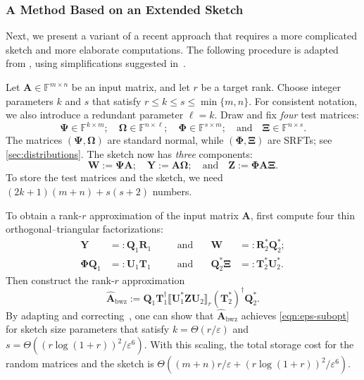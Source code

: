 \documentclass[final]{siamart1116}
\numberwithin{equation}{section}
\numberwithin{theorem}{section}
\numberwithin{figure}{section}
\newcommand{\F}{\mathbb{F}}
\newcommand{\eps}{\varepsilon}
\newcommand{\mtx}[1]{\bm{#1}}
\newcommand{\lowrank}[2]{\llbracket {#1} \rrbracket_{#2}}
\begin{document}
\subsubsection{A Method Based on an Extended Sketch}
\label{sec:optimal-alg}


Next, we present a variant of a recent approach that requires
a more complicated sketch and more elaborate computations.
The following procedure is adapted from \cite[Thm.~12]{BWZ16:Optimal-Principal-STOC},
using simplifications suggested in~\cite[Sec.~3]{Upa16:Fast-Space-Optimal}.

Let $\mtx{A} \in \F^{m \times n}$ be an input matrix,
and let $r$ be a target rank.  Choose integer parameters $k$ and $s$
that satisfy $r \leq k \leq s \leq \min\{m,n\}$.
For consistent notation, we also introduce a redundant parameter $\ell = k$.
Draw and fix \emph{four} test matrices:
\begin{equation} \label{eqn:fancy-test}
\mtx{\Psi} \in \F^{k \times m}; \quad
\mtx{\Omega} \in \F^{n \times \ell}; \quad
\mtx{\Phi} \in \F^{s \times m}; \quad\text{and}\quad
\mtx{\Xi} \in \F^{n \times s}.
\end{equation}
The matrices $(\mtx{\Psi}, \mtx{\Omega})$ are standard normal,
while $(\mtx{\Phi}, \mtx{\Xi})$ are SRFTs; see \cref{sec:distributions}.
The sketch now has \emph{three} components:
\begin{equation} \label{eqn:fancy-sketch}
\mtx{W} := \mtx{\Psi A}; \quad
\mtx{Y} := \mtx{A\Omega}; \quad\text{and}\quad
\mtx{Z} := \mtx{\Phi A \Xi}.
\end{equation}
To store the test matrices and the sketch, we need
$(2k + 1)(m + n) + s(s+2)$ numbers.

To obtain a rank-$r$ approximation of the input matrix $\mtx{A}$,
first compute four thin orthogonal--triangular factorizations:
$$
\begin{aligned}
\mtx{Y} &=: \mtx{Q}_1 \mtx{R}_1
&& \quad\text{and}\quad &
\mtx{W} &=: \mtx{R}_2^* \mtx{Q}_2^*; \\
\mtx{\Phi Q}_1 &=: \mtx{U}_1 \mtx{T}_1
&& \quad\text{and}\quad &
\mtx{Q}_2^* \mtx{\Xi} &=: \mtx{T}_2^* \mtx{U}_2^*.
\end{aligned}
$$
Then construct the rank-$r$ approximation
\begin{equation} \label{eqn:bwz}
\hat{\mtx{A}}_{\mathrm{bwz}} :=
	\mtx{Q}_1 \mtx{T}_1^{\dagger} \lowrank{\mtx{U}_1^* \mtx{Z} \mtx{U}_2}{r}
	(\mtx{T}_2^{*})^{\dagger} \mtx{Q}_2^*.
\end{equation}
By adapting and correcting~\cite[Thm.~12]{BWZ16:Optimal-Principal-STOC},
one can show that $\hat{\mtx{A}}_{\mathrm{bwz}}$ achieves \cref{eqn:eps-subopt}
for sketch size parameters that satisfy $k = \Theta(r/\eps)$
and $s = \Theta((r\log(1+ r))^2 / \eps^6)$.
With this scaling, the total storage cost for the random matrices
and the sketch is $\Theta((m+n)r/\eps + (r\log(1+r))^2 / \eps^6)$.
\end{document}

